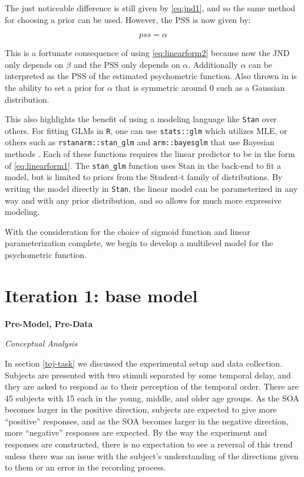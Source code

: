 \documentclass[11pt, oneside, openany]{scrbook}
\begin{document}
The just noticeable difference is still given by \eqref{eq:jnd1}, and so the same method for choosing a prior can be used. However, the PSS is now given by:

\[pss = \alpha\]

This is a fortunate consequence of using \eqref{eq:linearform2} because now the JND only depends on \(\beta\) and the PSS only depends on \(\alpha\). Additionally \(\alpha\) can be interpreted as the PSS of the estimated psychometric function. Also thrown in is the ability to set a prior for \(\alpha\) that is symmetric around \(0\) such as a Gaussian distribution.

This also highlights the benefit of using a modeling language like \texttt{Stan} over others. For fitting GLMs in \texttt{R}, one can use \texttt{stats::glm} which utilizes MLE, or others such as \texttt{rstanarm::stan\_glm} and \texttt{arm::bayesglm} that use Bayesian methods \citep{R-rstanarm, R-arm}. Each of these functions requires the linear predictor to be in the form of \eqref{eq:linearform1}. The \texttt{stan\_glm} function uses Stan in the back-end to fit a model, but is limited to priors from the Student-t family of distributions. By writing the model directly in \texttt{Stan}, the linear model can be parameterized in any way and with any prior distribution, and so allows for much more expressive modeling.

With the consideration for the choice of sigmoid function and linear parameterization complete, we begin to develop a multilevel model for the psychometric function.

\hypertarget{iter1}{%
\section{Iteration 1: base model}\label{iter1}}

\textbf{Pre-Model, Pre-Data}

\emph{Conceptual Analysis}

In section \ref{toj-task} we discussed the experimental setup and data collection. Subjects are presented with two stimuli separated by some temporal delay, and they are asked to respond as to their perception of the temporal order. There are 45 subjects with 15 each in the young, middle, and older age groups. As the SOA becomes larger in the positive direction, subjects are expected to give more ``positive'' responses, and as the SOA becomes larger in the negative direction, more ``negative'' responses are expected. By the way the experiment and responses are constructed, there is no expectation to see a reversal of this trend unless there was an issue with the subject's understanding of the directions given to them or an error in the recording process.
\end{document}
